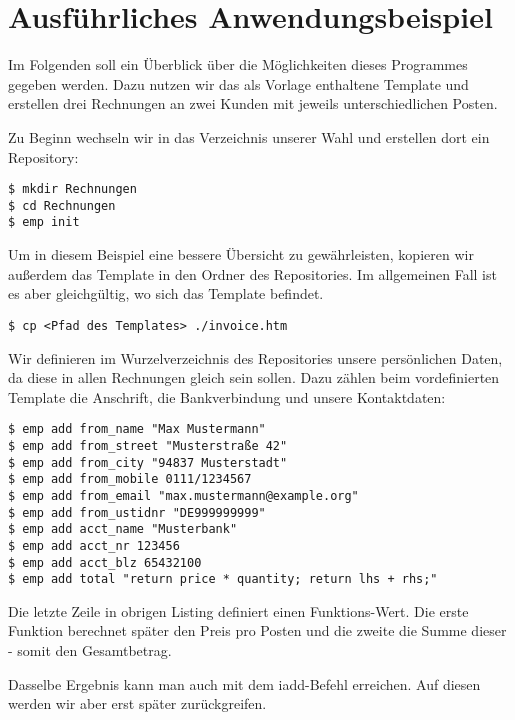 

\section{Ausführliches Anwendungsbeispiel}
Im Folgenden soll ein Überblick über die Möglichkeiten dieses Programmes gegeben werden. Dazu nutzen wir das als Vorlage enthaltene Template und erstellen drei Rechnungen an zwei Kunden mit jeweils unterschiedlichen Posten.

Zu Beginn wechseln wir in das Verzeichnis unserer Wahl und erstellen dort ein Repository:
\begin{lstlisting}[style=Bash]
$ mkdir Rechnungen
$ cd Rechnungen
$ emp init
\end{lstlisting}

Um in diesem Beispiel eine bessere Übersicht zu gewährleisten, kopieren wir außerdem das Template in den Ordner des Repositories. Im allgemeinen Fall ist es aber gleichgültig, wo sich das Template befindet.
\begin{lstlisting}[style=Bash]
$ cp <Pfad des Templates> ./invoice.htm
\end{lstlisting}


Wir definieren im Wurzelverzeichnis des Repositories unsere persönlichen Daten, da diese in allen Rechnungen gleich sein sollen. Dazu zählen beim vordefinierten Template die Anschrift, die Bankverbindung und unsere Kontaktdaten:

\begin{lstlisting}[style=Bash]
$ emp add from_name "Max Mustermann"
$ emp add from_street "Musterstraße 42"
$ emp add from_city "94837 Musterstadt"
$ emp add from_mobile 0111/1234567
$ emp add from_email "max.mustermann@example.org"
$ emp add from_ustidnr "DE999999999"
$ emp add acct_name "Musterbank"
$ emp add acct_nr 123456
$ emp add acct_blz 65432100
$ emp add total "return price * quantity; return lhs + rhs;"
\end{lstlisting}

Die letzte Zeile in obrigen Listing definiert einen Funktions-Wert. Die erste Funktion berechnet später den Preis pro Posten und die zweite die Summe dieser - somit den Gesamtbetrag.

Dasselbe Ergebnis kann man auch mit dem iadd-Befehl erreichen. Auf diesen werden wir aber erst später zurückgreifen.


